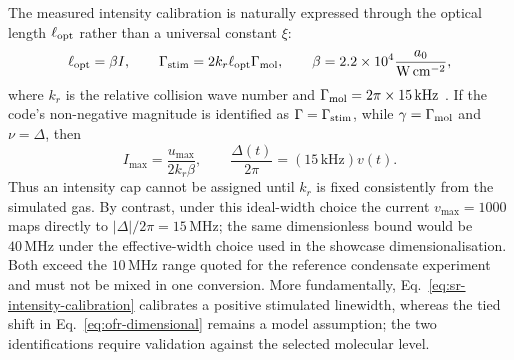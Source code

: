 \documentclass[9pt,a4paper,twocolumn,twoside]{rho-class/rho}
\begin{document}
        The measured intensity calibration is naturally expressed through the optical length $\ell_{\rm opt}$ rather than a universal constant $\xi$:
        \begin{equation}\label{eq:sr-intensity-calibration}
            \ell_{\rm opt}=\beta I,\qquad
            \Gamma_{\rm stim}=2k_r\ell_{\rm opt}\Gamma_{\rm mol},\qquad
            \beta=2.2\times10^4\frac{a_0}{\mathrm{W\,cm^{-2}}},
        \end{equation}
        where $k_r$ is the relative collision wave number and
        $\Gamma_{\rm mol}=2\pi\times15\,\mathrm{kHz}$
        \cite{yan2013controlling}.  If the code's non-negative magnitude is
        identified as $\Gamma=\Gamma_{\rm stim}$, while
        $\gamma=\Gamma_{\rm mol}$ and $\nu=\Delta$, then
        \begin{equation}\label{eq:intensity-conversion}
            I_{\max}=\frac{u_{\max}}{2k_r\beta},\qquad
            \frac{\Delta(t)}{2\pi}=\left(15\,\mathrm{kHz}\right)v(t).
        \end{equation}
        Thus an intensity cap cannot be assigned until $k_r$ is fixed
        consistently from the simulated gas. By contrast, under this
        ideal-width choice the current $v_{\max}=1000$ maps directly to
        $|\Delta|/2\pi=15\,\mathrm{MHz}$; the same dimensionless bound would be
        $40\,\mathrm{MHz}$ under the effective-width choice used in the
        showcase dimensionalisation. Both exceed the $10\,\mathrm{MHz}$ range
        quoted for the reference condensate experiment and must not be mixed in
        one conversion.  More fundamentally,
        Eq.~\eqref{eq:sr-intensity-calibration} calibrates a positive
        stimulated linewidth, whereas the tied shift in
        Eq.~\eqref{eq:ofr-dimensional} remains a model assumption; the two
        identifications require validation against the selected molecular
        level.
\end{document}
